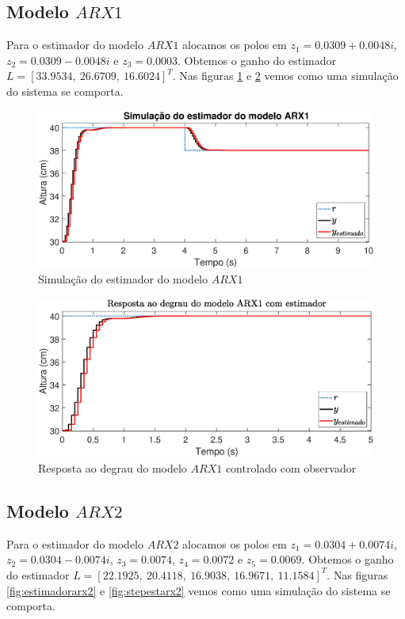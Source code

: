 \subsection{Modelo $ARX1$}\label{s:estarx1}
Para o estimador do modelo $ARX1$ alocamos os polos em $z_1=0.0309 + 0.0048i$, $z_2=0.0309 - 0.0048i$ e $z_3=0.0003$. Obtemos o ganho do estimador $L=[33.9534,~26.6709,~16.6024]^T$. Nas figuras \ref{fig:estimadorarx1} e \ref{fig:stepestarx1} vemos como uma simulação do sistema se comporta.

\begin{figure}[H]
	\centering
	\includegraphics[width=1\linewidth]{estimadorarx1}
	\caption[Simulação do estimador do modelo $ARX1$]{Simulação do estimador do modelo $ARX1$}
	\label{fig:estimadorarx1}
\end{figure}

\begin{figure}[H]
	\centering
	\includegraphics[width=1\linewidth]{stepestarx1}
	\caption[Resposta ao degrau do modelo $ARX1$ controlado com observador]{Resposta ao degrau do modelo $ARX1$ controlado com observador}
	\label{fig:stepestarx1}
\end{figure}

\subsection{Modelo $ARX2$}\label{s:estarx2}
Para o estimador do modelo $ARX2$ alocamos os polos em $z_1=0.0304 + 0.0074i$, $z_2=0.0304 - 0.0074i$, $z_3=0.0074$, $z_4=0.0072$ e $z_5=0.0069$. Obtemos o ganho do estimador $L=[22.1925,~20.4118,~ 16.9038,~16.9671,~11.1584]^T$. Nas figuras \ref{fig:estimadorarx2} e \ref{fig:stepestarx2} vemos como uma simulação do sistema se comporta.

